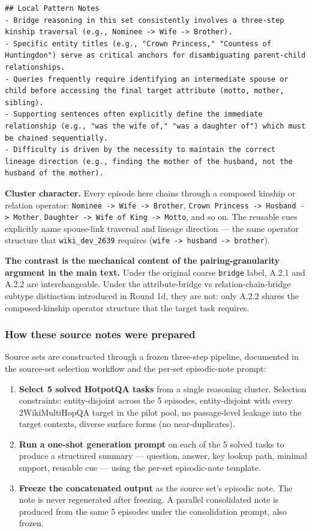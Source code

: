 \begin{lstlisting}
## Local Pattern Notes
- Bridge reasoning in this set consistently involves a three-step kinship traversal (e.g., Nominee -> Wife -> Brother).
- Specific entity titles (e.g., "Crown Princess," "Countess of Huntingdon") serve as critical anchors for disambiguating parent-child relationships.
- Queries frequently require identifying an intermediate spouse or child before accessing the final target attribute (motto, mother, sibling).
- Supporting sentences often explicitly define the immediate relationship (e.g., "was the wife of," "was a daughter of") which must be chained sequentially.
- Difficulty is driven by the necessity to maintain the correct lineage direction (e.g., finding the mother of the husband, not the husband of the mother).
\end{lstlisting}

\textbf{Cluster character.} Every episode here chains through a composed kinship or relation operator: \texttt{Nominee -> Wife -> Brother}, \texttt{Crown Princess -> Husband -> Mother}, \texttt{Daughter -> Wife of King -> Motto}, and so on. The reusable cues explicitly name spouse-link traversal and lineage direction --- the same operator structure that \texttt{wiki\_dev\_2639} requires (\texttt{wife -> husband -> brother}).

\textbf{The contrast is the mechanical content of the pairing-granularity argument in the main text.} Under the original coarse \texttt{bridge} label, A.2.1 and A.2.2 are interchangeable. Under the attribute-bridge vs relation-chain-bridge subtype distinction introduced in Round 1d, they are not: only A.2.2 shares the composed-kinship operator structure that the target task requires.

\subsubsection{How these source notes were prepared}

Source sets are constructed through a frozen three-step pipeline, documented in the source-set selection workflow and the per-set episodic-note prompt:

\begin{enumerate}
\item \textbf{Select 5 solved HotpotQA tasks} from a single reasoning cluster. Selection constraints: entity-disjoint across the 5 episodes, entity-disjoint with every 2WikiMultiHopQA target in the pilot pool, no passage-level leakage into the target contexts, diverse surface forms (no near-duplicates).
\item \textbf{Run a one-shot generation prompt} on each of the 5 solved tasks to produce a structured summary --- question, answer, key lookup path, minimal support, reusable cue --- using the per-set episodic-note template.
\item \textbf{Freeze the concatenated output} as the source set's episodic note. The note is never regenerated after freezing. A parallel consolidated note is produced from the same 5 episodes under the consolidation prompt, also frozen.
\end{enumerate}

